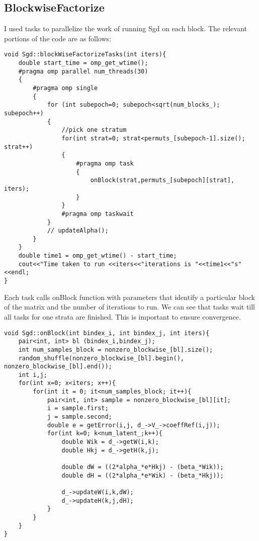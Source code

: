 \documentclass[a4paper,11pt]{article}
\begin{document}
\subsection{BlockwiseFactorize}
I used tasks to parallelize the work of running Sgd on each block. The relevant portions of the code are as follows:
\begin{lstlisting}
void Sgd::blockWiseFactorizeTasks(int iters){
	double start_time = omp_get_wtime();
	#pragma omp parallel num_threads(30)
	{
		#pragma omp single
		{
			for (int subepoch=0; subepoch<sqrt(num_blocks_); subepoch++)
			{
				//pick one stratum
				for(int strat=0; strat<permuts_[subepoch-1].size(); strat++)
				{
					#pragma omp task
					{
						onBlock(strat,permuts_[subepoch][strat], iters);
					}
				}
				#pragma omp taskwait
			}
			// updateAlpha();
		}		
	}
	double time1 = omp_get_wtime() - start_time;
	cout<<"Time taken to run <<iters<<"iterations is "<<time1<<"s"<<endl;
}
\end{lstlisting}
Each task calls onBlock function with parameters that identify a particular block of the matrix and the number of iterations to run.
We can see that tasks wait till all tasks for one strata are finished. This is important to ensure convergence.
\begin{lstlisting}
void Sgd::onBlock(int bindex_i, int bindex_j, int iters){
	pair<int, int> bl (bindex_i,bindex_j);
	int num_samples_block = nonzero_blockwise_[bl].size();
	random_shuffle(nonzero_blockwise_[bl].begin(), nonzero_blockwise_[bl].end());
	int i,j;
	for(int x=0; x<iters; x++){
		for(int it = 0; it<num_samples_block; it++){
			pair<int, int> sample = nonzero_blockwise_[bl][it];
			i = sample.first;
			j = sample.second;
			double e = getError(i,j, d_->V_->coeffRef(i,j));
			for(int k=0; k<num_latent_;k++){
				double Wik = d_->getW(i,k);
				double Hkj = d_->getH(k,j);

				double dW = ((2*alpha_*e*Hkj) - (beta_*Wik));
				double dH = ((2*alpha_*e*Wik) - (beta_*Hkj));

				d_->updateW(i,k,dW);
				d_->updateH(k,j,dH);
			}
		}
	}
}
\end{lstlisting}
\end{document}

